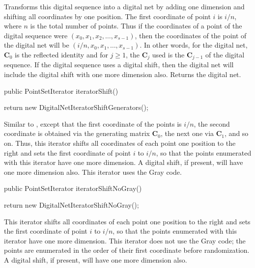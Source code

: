\begin{tabb}
  Transforms this digital sequence into a digital net by adding one dimension
  and shifting all coordinates by one position. The first coordinate of point
  $i$ is $i/n$, where $n$ is the total number of points.
  Thus if the coordinates of a point of the digital sequence were
  $(x_0, x_1, x_2, \ldots, x_{s-1})$, then the coordinates of the
  point of the digital net will be $(i/n, x_0, x_1, \ldots, x_{s-1})$.
  In other words, for the digital net, $\mathbf{C}_0$ is the reflected 
  identity and for $j\ge 1$, the $\mathbf{C}_j$ used is the
  $\mathbf{C}_{j-1}$ of the digital sequence. If the digital sequence uses
  a digital shift, then the digital net will include the digital shift with
  one more dimension also.  Returns the digital net.
\end{tabb}
\begin{code}

   public PointSetIterator iteratorShift()\begin{hide} {
      return new DigitalNetIteratorShiftGenerators();
   }\end{hide}
\end{code}
\begin{tabb}
  Similar to , except that the first coordinate
  of the points is $i/n$, the second coordinate is obtained via
  the generating matrix $\mathbf{C}_0$, the next one via $\mathbf{C}_1$, 
  and so on. Thus, this iterator shifts all coordinates of each point
  one position to the right and sets the first coordinate of point $i$
  to  $i/n$, so that the points enumerated with this iterator have one more
  dimension. A digital shift, if present, will have one more dimension also.
  This iterator uses the Gray code.
\end{tabb}
\begin{code}

   public PointSetIterator iteratorShiftNoGray()\begin{hide} {
      return new DigitalNetIteratorShiftNoGray();
   }\end{hide}
\end{code}
\begin{tabb}
  This iterator shifts all coordinates of each point one position to the right
  and sets the first coordinate of point $i$  to  $i/n$, so that the points 
  enumerated with this iterator have one more dimension. 
  This iterator does not use the Gray code; the points are enumerated in the 
  order of their first coordinate before randomization.
  A digital shift, if present, will have one more dimension also.
\end{tabb}
